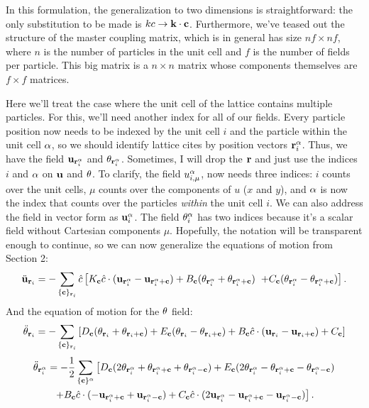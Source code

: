 \documentclass[12pt]{article}
\begin{document}
In this formulation, the generalization to two dimensions is straightforward: 
the only substitution to be made is $kc \rightarrow \mathbf{k}\cdot\mathbf{c}$. Furthermore, we've 
teased out the structure of the master coupling matrix, which is in general has 
size $nf \times nf $, where $n$ is the number of particles in the 
unit cell and $f$ is the number of fields per particle. This big matrix is a 
$n\times n$ matrix whose components themselves are $f\times f$ matrices.










\pagebreak




Here we'll treat the case where the unit cell of the lattice contains multiple 
particles. For this, we'll need another index for all of our fields. Every 
particle position now needs to be indexed by the unit cell $i$ and the 
particle within the unit cell $\alpha$, so we should identify lattice cites by 
position vectors $\mathbf{r}_i^\alpha$. Thus, we have the field $\mathbf{u}_{\mathbf{r}_i^\alpha}$ and 
$\theta_{\mathbf{r}_i^\alpha}$. Sometimes, I will drop the $\mathbf{r}$ and just use the indices 
$i$ and $\alpha$ on $\mathbf{u}$ and $\theta$. To clarify, the field $u_{i,\mu}^\alpha$, now 
needs three indices: $i$ counts over the unit cells, $\mu$ counts over the 
components of $u$ ($x$ and $y$), and $\alpha$ is now the index that counts over the 
particles \emph{within} the unit cell $i$. We can also address the field in 
vector form as $\mathbf{u}_i^\alpha$. The field $\theta_{i}^\alpha$ has two indices because it's 
a scalar field without Cartesian components $\mu$. Hopefully, the notation 
will be transparent enough to continue, so we can now generalize the equations 
of motion from Section 2:
\[ \ddot {\mathbf{u}}_{\mathbf{r}_i} = -\sum_{\{\mathbf{c}\}_{\mathbf{r}_i}} \hat c  \left [   K_{\mathbf{c}} \hat c \cdot  (\mathbf{u}_{\mathbf{r}_i^\alpha} - \mathbf{u}_{\mathbf{r}_i^\alpha + \mathbf{c}})  + 
B_{\mathbf{c}}(\theta_{\mathbf{r}_i^\alpha} + \theta_{\mathbf{r}_i^\alpha + \mathbf{c}}) 
\right. \\ \left.+ C_{\mathbf{c}} (\theta_{\mathbf{r}_i^\alpha} - \theta_{\mathbf{r}_i^\alpha +\mathbf{c}})   
\right].\]
And the equation of motion for the $\theta$ field:
\[ \ddot {\theta}_{\mathbf{r}_i} = -\sum_{\{\mathbf{c}\}_{\mathbf{r}_i} } \left [D_{\mathbf{c}}(\theta_{\mathbf{r}_i} 
+\theta_{\mathbf{r}_i + \mathbf{c}}) + E_{\mathbf{c}} (\theta_{\mathbf{r}_i} - \theta_{\mathbf{r}_i + \mathbf{c}}) + B_{\mathbf{c}} \hat c \cdot (\mathbf{u}_{\mathbf{r}_i} - \mathbf{u}_{\mathbf{r}_i +\mathbf{c}} ) + C_{\mathbf{c}}   \right ]  
  \]
\begin{multline*}   \ddot {\theta}_{\mathbf{r}_i^\alpha} = -\frac{1}{2} \sum_{\{\mathbf{c}\}^\alpha} 
\left [ D_{\mathbf{c}} (2\theta_{\mathbf{r}_i^\alpha} + \theta_{\mathbf{r}_i^\alpha + \mathbf{c}} + 
\theta_{\mathbf{r}_i^\alpha - \mathbf{c}}) + E_{\mathbf{c}}(2\theta_{\mathbf{r}_i^\alpha} - \theta_{\mathbf{r}_i^\alpha + 
\mathbf{c}} - \theta_{\mathbf{r}_i^\alpha - \mathbf{c}}) \right. \\ \left. + B_{\mathbf{c}} 
\hat c \cdot (- \mathbf{u}_{\mathbf{r}_i^\alpha + \mathbf{c}} + \mathbf{u}_{\mathbf{r}_i^\alpha - \mathbf{c}}) + C_{\mathbf{c}} \hat c \cdot (2\mathbf{u}_{\mathbf{r}_i^\alpha} - \mathbf{u}_{\mathbf{r}_i^\alpha 
+ \mathbf{c}} - \mathbf{u}_{\mathbf{r}_i^\alpha - \mathbf{c}}) \right ]. \end{multline*}
\end{document}
